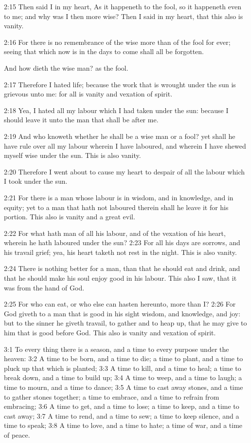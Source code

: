 2:15 Then said I in my heart, As it happeneth to the fool, so it
happeneth even to me; and why was I then more wise? Then I said in my
heart, that this also is vanity.

2:16 For there is no remembrance of the wise more than of the fool for
ever; seeing that which now is in the days to come shall all be
forgotten.

And how dieth the wise man? as the fool.

2:17 Therefore I hated life; because the work that is wrought under
the sun is grievous unto me: for all is vanity and vexation of spirit.

2:18 Yea, I hated all my labour which I had taken under the sun:
because I should leave it unto the man that shall be after me.

2:19 And who knoweth whether he shall be a wise man or a fool? yet
shall he have rule over all my labour wherein I have laboured, and
wherein I have shewed myself wise under the sun. This is also vanity.

2:20 Therefore I went about to cause my heart to despair of all the
labour which I took under the sun.

2:21 For there is a man whose labour is in wisdom, and in knowledge,
and in equity; yet to a man that hath not laboured therein shall he
leave it for his portion. This also is vanity and a great evil.

2:22 For what hath man of all his labour, and of the vexation of his
heart, wherein he hath laboured under the sun?  2:23 For all his days
are sorrows, and his travail grief; yea, his heart taketh not rest in
the night. This is also vanity.

2:24 There is nothing better for a man, than that he should eat and
drink, and that he should make his soul enjoy good in his labour. This
also I saw, that it was from the hand of God.

2:25 For who can eat, or who else can hasten hereunto, more than I?
2:26 For God giveth to a man that is good in his sight wisdom, and
knowledge, and joy: but to the sinner he giveth travail, to gather and
to heap up, that he may give to him that is good before God. This also
is vanity and vexation of spirit.

3:1 To every thing there is a season, and a time to every purpose
under the heaven: 3:2 A time to be born, and a time to die; a time to
plant, and a time to pluck up that which is planted; 3:3 A time to
kill, and a time to heal; a time to break down, and a time to build
up; 3:4 A time to weep, and a time to laugh; a time to mourn, and a
time to dance; 3:5 A time to cast away stones, and a time to gather
stones together; a time to embrace, and a time to refrain from
embracing; 3:6 A time to get, and a time to lose; a time to keep, and
a time to cast away; 3:7 A time to rend, and a time to sew; a time to
keep silence, and a time to speak; 3:8 A time to love, and a time to
hate; a time of war, and a time of peace.


